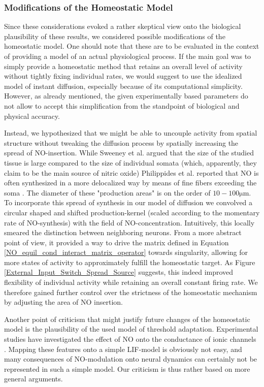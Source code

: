\documentclass[10pt,a4paper]{article}
\begin{document}
\subsubsection{Modifications of the Homeostatic Model}\label{Possible_Modifications_Section}
Since these considerations evoked a rather skeptical view onto the biological plausibility of these results, we considered possible modifications of the homeostatic model. One should note that these are to be evaluated in the context of providing a model of an actual physiological process. If the main goal was to simply provide a homeostatic method that retains an overall level of activity without tightly fixing individual rates, we would suggest to use the idealized model of instant diffusion, especially because of its computational simplicity. However, as already mentioned, the given experimentally based parameters do not allow to accept this simplification from the standpoint of biological and physical accuracy.

Instead, we hypothesized that we might be able to uncouple activity from spatial structure without tweaking the diffusion process by spatially increasing the spread of NO-insertion. While Sweeney et al. argued that the size of the studied tissue is large compared to the size of individual somata (which, apparently, they claim to be the main source of nitric oxide) Philippides et al. reported that NO is often synthesized in a more delocalized way by means of fine fibers exceeding the soma \cite{Philippides_2005}. The diameter of these "production areas" is on the order of $\mathrm{10-100 \mu m}$. To incorporate this spread of synthesis in our model of diffusion we convolved a circular shaped and shifted production-kernel (scaled according to the momentary rate of NO-synthesis) with the field of NO-concentration. Intuitively, this locally smeared the distinction between neighboring neurons. From a more abstract point of view, it provided a way to drive the matrix defined in Equation \eqref{NO_equil_cond_interact_matrix_operator} towards singularity, allowing for more states of activity to approximately fulfill the homeostatic target. As Figure \ref{External_Input_Switch_Spread_Source} suggests, this indeed improved flexibility of individual activity while retaining an overall constant firing rate. We therefore gained further control over the strictness of the homeostatic mechanism by adjusting the area of NO insertion.

Another point of criticism that might justify future changes of the homeostatic model is the plausibility of the used model of threshold adaptation. Experimental studies have investigated the effect of NO onto the conductance of ionic channels \cite{Steinert_NO,Steinert_NO_2011}. Mapping these features onto a simple LIF-model is obviously not easy, and many consequences of NO-modulation onto neural dynamics can certainly not be represented in such a simple model. Our criticism is thus rather based on more general arguments.
\end{document}

